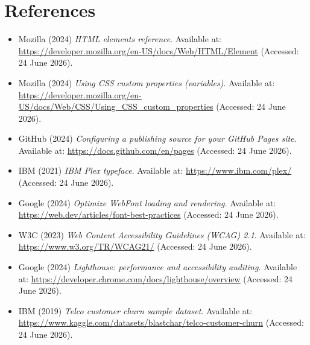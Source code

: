 \documentclass[11pt,a4paper]{article}
\begin{document}
\section{References}

\begin{itemize}[leftmargin=2em]
  \item[] Mozilla (2024) \textit{HTML elements reference}. Available at:
        \url{https://developer.mozilla.org/en-US/docs/Web/HTML/Element}
        (Accessed: 24 June 2026).
  \item[] Mozilla (2024) \textit{Using CSS custom properties (variables)}.
        Available at:
        \url{https://developer.mozilla.org/en-US/docs/Web/CSS/Using_CSS_custom_properties}
        (Accessed: 24 June 2026).
  \item[] GitHub (2024) \textit{Configuring a publishing source for your GitHub
        Pages site}. Available at:
        \url{https://docs.github.com/en/pages} (Accessed: 24 June 2026).
  \item[] IBM (2021) \textit{IBM Plex typeface}. Available at:
        \url{https://www.ibm.com/plex/} (Accessed: 24 June 2026).
  \item[] Google (2024) \textit{Optimize WebFont loading and rendering}.
        Available at: \url{https://web.dev/articles/font-best-practices}
        (Accessed: 24 June 2026).
  \item[] W3C (2023) \textit{Web Content Accessibility Guidelines (WCAG) 2.1}.
        Available at: \url{https://www.w3.org/TR/WCAG21/} (Accessed: 24 June 2026).
  \item[] Google (2024) \textit{Lighthouse: performance and accessibility
        auditing}. Available at:
        \url{https://developer.chrome.com/docs/lighthouse/overview} (Accessed:
        24 June 2026).
  \item[] IBM (2019) \textit{Telco customer churn sample dataset}. Available at:
        \url{https://www.kaggle.com/datasets/blastchar/telco-customer-churn}
        (Accessed: 24 June 2026).
\end{itemize}
\end{document}
